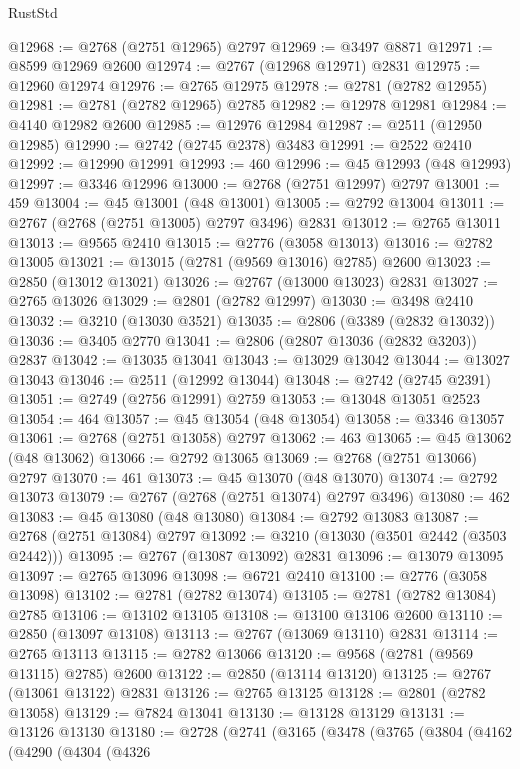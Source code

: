 \begin{lexlean}{RustStd}
\begin{coremodule}
@12968 := @2768 (@2751 @12965) @2797
@12969 := @3497 @8871
@12971 := @8599 @12969 @2600
@12974 := @2767 (@12968 @12971) @2831
@12975 := @12960 @12974
@12976 := @2765 @12975
@12978 := @2781 (@2782 @12955)
@12981 := @2781 (@2782 @12965) @2785
@12982 := @12978 @12981
@12984 := @4140 @12982 @2600
@12985 := @12976 @12984
@12987 := @2511 (@12950 @12985)
@12990 := @2742 (@2745 @2378) @3483
@12991 := @2522 @2410
@12992 := @12990 @12991
@12993 := 460
@12996 := @45 @12993 (@48 @12993)
@12997 := @3346 @12996
@13000 := @2768 (@2751 @12997) @2797
@13001 := 459
@13004 := @45 @13001 (@48 @13001)
@13005 := @2792 @13004
@13011 := @2767 (@2768 (@2751 @13005) @2797 @3496) @2831
@13012 := @2765 @13011
@13013 := @9565 @2410
@13015 := @2776 (@3058 @13013)
@13016 := @2782 @13005
@13021 := @13015 (@2781 (@9569 @13016) @2785) @2600
@13023 := @2850 (@13012 @13021)
@13026 := @2767 (@13000 @13023) @2831
@13027 := @2765 @13026
@13029 := @2801 (@2782 @12997)
@13030 := @3498 @2410
@13032 := @3210 (@13030 @3521)
@13035 := @2806 (@3389 (@2832 @13032))
@13036 := @3405 @2770
@13041 := @2806 (@2807 @13036 (@2832 @3203)) @2837
@13042 := @13035 @13041
@13043 := @13029 @13042
@13044 := @13027 @13043
@13046 := @2511 (@12992 @13044)
@13048 := @2742 (@2745 @2391)
@13051 := @2749 (@2756 @12991) @2759
@13053 := @13048 @13051 @2523
@13054 := 464
@13057 := @45 @13054 (@48 @13054)
@13058 := @3346 @13057
@13061 := @2768 (@2751 @13058) @2797
@13062 := 463
@13065 := @45 @13062 (@48 @13062)
@13066 := @2792 @13065
@13069 := @2768 (@2751 @13066) @2797
@13070 := 461
@13073 := @45 @13070 (@48 @13070)
@13074 := @2792 @13073
@13079 := @2767 (@2768 (@2751 @13074) @2797 @3496)
@13080 := 462
@13083 := @45 @13080 (@48 @13080)
@13084 := @2792 @13083
@13087 := @2768 (@2751 @13084) @2797
@13092 := @3210 (@13030 (@3501 @2442 (@3503 @2442)))
@13095 := @2767 (@13087 @13092) @2831
@13096 := @13079 @13095
@13097 := @2765 @13096
@13098 := @6721 @2410
@13100 := @2776 (@3058 @13098)
@13102 := @2781 (@2782 @13074)
@13105 := @2781 (@2782 @13084) @2785
@13106 := @13102 @13105
@13108 := @13100 @13106 @2600
@13110 := @2850 (@13097 @13108)
@13113 := @2767 (@13069 @13110) @2831
@13114 := @2765 @13113
@13115 := @2782 @13066
@13120 := @9568 (@2781 (@9569 @13115) @2785) @2600
@13122 := @2850 (@13114 @13120)
@13125 := @2767 (@13061 @13122) @2831
@13126 := @2765 @13125
@13128 := @2801 (@2782 @13058)
@13129 := @7824 @13041
@13130 := @13128 @13129
@13131 := @13126 @13130
@13180 := @2728
    (@2741
      (@3165
        (@3478
          (@3765
            (@3804
              (@4162
                (@4290
                  (@4304
                    (@4326

\end{coremodule}
\end{lexlean}
